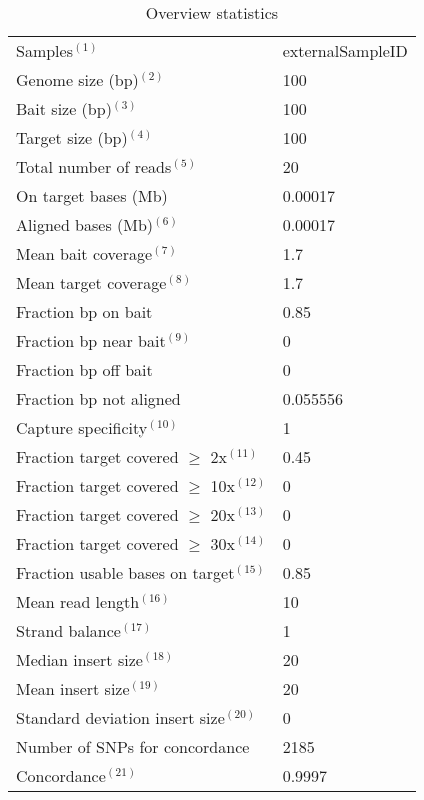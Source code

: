 \begin{table}[h!]
 \caption{Overview statistics}
 \begin{narrow}{-1in}{-1in}
 \centering
\begin{tabular}{l l} 
  \hline 
  Samples$^{(1)}$ & externalSampleID \\ 
  Genome size (bp)$^{(2)}$ & 100 \\ 
  Bait size (bp)$^{(3)}$ & 100 \\ 
  Target size (bp)$^{(4)}$ & 100 \\ 
  Total number of reads$^{(5)}$ & 20 \\ 
  On target bases (Mb) & 0.00017 \\ 
  Aligned bases (Mb)$^{(6)}$ & 0.00017 \\ 
  Mean bait coverage$^{(7)}$ & 1.7 \\ 
  Mean target coverage$^{(8)}$ & 1.7 \\ 
  Fraction bp on bait & 0.85 \\ 
  Fraction bp near bait$^{(9)}$ & 0 \\ 
  Fraction bp off bait & 0 \\ 
  Fraction bp not aligned & 0.055556 \\ 
  Capture specificity$^{(10)}$ & 1 \\ 
  Fraction target covered $\ge$ 2x$^{(11)}$ & 0.45 \\ 
  Fraction target covered $\ge$ 10x$^{(12)}$ & 0 \\ 
  Fraction target covered $\ge$ 20x$^{(13)}$ & 0 \\ 
  Fraction target covered $\ge$ 30x$^{(14)}$ & 0 \\ 
  Fraction usable bases on target$^{(15)}$ & 0.85 \\ 
  Mean read length$^{(16)}$ & 10 \\ 
  Strand balance$^{(17)}$ & 1 \\ 
  Median insert size$^{(18)}$ & 20 \\ 
  Mean insert size$^{(19)}$ & 20 \\ 
  Standard deviation insert size$^{(20)}$ & 0 \\ 
  Number of SNPs for concordance & 2185 \\ 
  Concordance$^{(21)}$ & 0.9997 \\ 
\hline 
\end{tabular}\end{narrow}
 \end{table}

